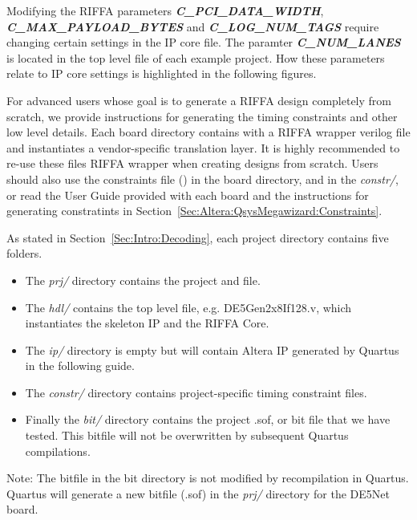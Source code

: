 \documentclass{refrep}
\newcommand{\Directory}[1]{\textit{#1}}
\newcommand{\Altera}[1]{{\color{blue}{#1}}}
\newcommand{\RIFFAParameter}[1]{\textit{\textbf{#1}}}
\begin{document}
Modifying the RIFFA parameters \RIFFAParameter{C\_PCI\_DATA\_WIDTH},
\RIFFAParameter{C\_MAX\_PAYLOAD\_BYTES} and \RIFFAParameter{C\_LOG\_NUM\_TAGS}
require changing certain settings in the IP core file. The paramter
\RIFFAParameter{C\_NUM\_LANES} is located in the top level file of each example
project. How these parameters relate to IP core settings is highlighted in the
following figures.

For advanced users whose goal is to generate a RIFFA design completely from
scratch, we provide instructions for generating the timing constraints and other
low level details. Each board directory contains with a RIFFA wrapper verilog
file and instantiates a vendor-specific translation layer. It is highly
recommended to re-use these files RIFFA wrapper when creating designs from
scratch. Users should also use the constraints file (\Altera{.sdc}) in the board
directory, and in the \Directory{constr/}, or read the User Guide provided with
each board and the instructions for generating constratints in
Section~\ref{Sec:Altera:QsysMegawizard:Constraints}.

As stated in Section~\ref{Sec:Intro:Decoding}, each project directory contains five folders.
\begin{itemize}
\item The \Directory{prj/} directory contains the project \Altera{.qpf} and \Altera{.qsf} file.
\item The \Directory{hdl/} contains the top level file, e.g. DE5Gen2x8If128.v, which instantiates the skeleton IP and the RIFFA Core.
\item The \Directory{ip/} directory is empty but will contain Altera IP generated by Quartus
  in the following guide.
\item The \Directory{constr/} directory contains project-specific timing constraint files.
\item Finally the \Directory{bit/} directory contains the project .sof, or bit
  file that we have tested. This bitfile will not be overwritten by subsequent Quartus compilations.
\end{itemize}

Note: The bitfile in the bit directory is not modified by recompilation in
Quartus. Quartus will generate a new bitfile (.sof) in the \Directory{prj/}
directory for the DE5Net board.
\end{document}
